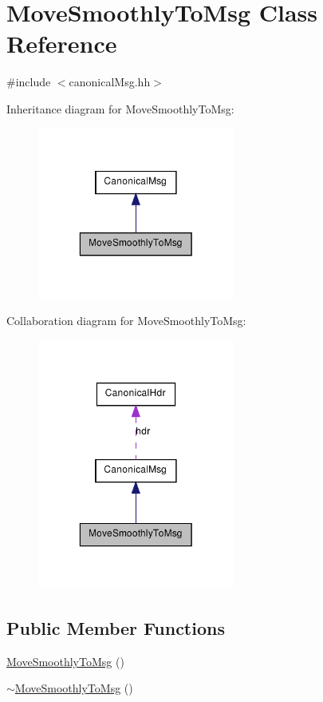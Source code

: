 \hypertarget{class_move_smoothly_to_msg}{
\section{MoveSmoothlyToMsg Class Reference}
\label{class_move_smoothly_to_msg}
}


{\ttfamily \#include $<$canonicalMsg.hh$>$}



Inheritance diagram for MoveSmoothlyToMsg:\nopagebreak
\begin{figure}[H]
\begin{center}
\leavevmode
\includegraphics[width=184pt]{class_move_smoothly_to_msg__inherit__graph}
\end{center}
\end{figure}


Collaboration diagram for MoveSmoothlyToMsg:\nopagebreak
\begin{figure}[H]
\begin{center}
\leavevmode
\includegraphics[width=184pt]{class_move_smoothly_to_msg__coll__graph}
\end{center}
\end{figure}
\subsection*{Public Member Functions}
\begin{DoxyCompactItemize}
\item 
\hyperlink{class_move_smoothly_to_msg_a696e298ef8f581019bd8652dea3470a0}{MoveSmoothlyToMsg} ()
\item 
\hyperlink{class_move_smoothly_to_msg_aaac8d5cf5eb3a1cc2ef919493eb1a116}{$\sim$MoveSmoothlyToMsg} ()
\end{DoxyCompactItemize}
